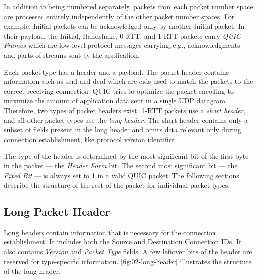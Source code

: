 In addition to being numbered separately, packets from each packet number space are processed
entirely independently of the other packet number spaces. For example, Initial packets can be
acknowledged only by another Initial packet. In their payload, the Initial, Handshake, 0-RTT, and
1-RTT packets carry \textit{QUIC Frames} which are low-level protocol messages carrying, e.g.,
acknowledgments and parts of streams sent by the application.

Each packet type has a header and a payload. The packet header contains information such as
\gls{scid} and \gls{dcid} which are \glspl{cid} used to match the packets to the correct receiving
connection. QUIC tries to optimize the packet encoding to maximize the amount of application data
sent in a single UDP datagram. Therefore, two types of packet headers exist. 1-RTT packets use a
\textit{short header}, and all other packet types use the \textit{long header}. The short header
contains only a subset of fields present in the long header and omits data relevant only during
connection establishment, like protocol version identifier.

The type of the header is determined by the most significant bit of the first byte in the packet ---
the \textit{Header Form} bit. The second most significant bit --- the \textit{Fixed Bit} --- is
always set to 1 in a valid QUIC packet. The following sections describe the structure of the rest of
the packet for individual packet types.

\newcommand{\longFieldHeight}{1}

\subsection{Long Packet Header}

Long headers contain information that is necessary for the connection establishment. It includes
both the Source and Destination Connection IDs. It also contains \textit{Version} and \textit{Packet
Type} fields. A few leftover bits of the header are reserved for type-specific information.
\autoref{fig:02-long-header} illustrates the structure of the long header.

